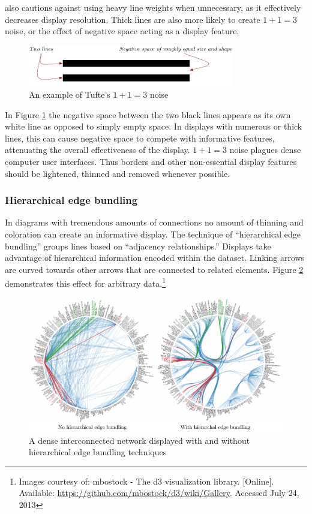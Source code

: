  also cautions against using heavy line weights when unnecessary, as it effectively decreases display resolution. Thick lines are also more likely to create $1 + 1 = 3$ noise, or the effect of negative space acting as a display feature.

\begin{figure}[ht]
\centering
	\includegraphics[width=0.8\textwidth]{figures/1and1equals3}
\caption{An example of Tufte's $1 + 1 = 3$ noise}
\label{fig:1and1equals3}
\end{figure}

In Figure \ref{fig:1and1equals3} the negative space between the two black lines appears as its own white line as opposed to simply empty space. In displays with numerous or thick lines, this can cause negative space to compete with informative features, attenuating the overall effectiveness of the display. $1 + 1 = 3$ noise plagues dense computer user interfaces. Thus borders and other non-essential display features should be lightened, thinned and removed whenever possible.

	\subsubsection{Hierarchical edge bundling}

In diagrams with tremendous amounts of connections no amount of thinning and coloration can create an informative display. The technique of ``hierarchical edge bundling'' \cite{HEB} groups lines based on ``adjacency relationships.'' Displays take advantage of hierarchical information encoded within the dataset. Linking arrows are curved towards other arrows that are connected to related elements. Figure \ref{fig:heb} demonstrates this effect for arbitrary data.\footnote{Images courtesy of: mbostock - The d3 visualization library. [Online]. Available: \url{https://github.com/mbostock/d3/wiki/Gallery}. Accessed July 24, 2013} 
\begin{figure}[h]
\centering
	\includegraphics[width=\textwidth]{figures/heb}
\caption{A dense interconnected network displayed with and without hierarchical edge bundling techniques}
\label{fig:heb}
\end{figure}

